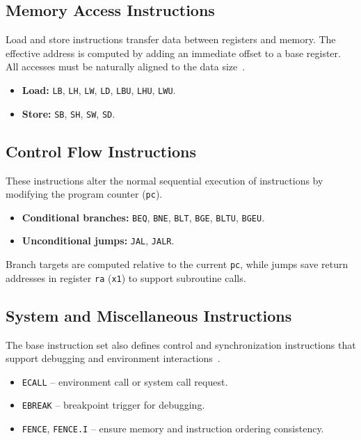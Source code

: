 \subsection{Memory Access Instructions}
Load and store instructions transfer data between registers and memory.  
The effective address is computed by adding an immediate offset to a base register.  
All accesses must be naturally aligned to the data size~\cite{riscv-spec}.
\begin{itemize}
  \item \textbf{Load:} \texttt{LB}, \texttt{LH}, \texttt{LW}, \texttt{LD}, \texttt{LBU}, \texttt{LHU}, \texttt{LWU}.
  \item \textbf{Store:} \texttt{SB}, \texttt{SH}, \texttt{SW}, \texttt{SD}.
\end{itemize}

\subsection{Control Flow Instructions}
These instructions alter the normal sequential execution of instructions by modifying the program counter (\texttt{pc}).
\begin{itemize}
  \item \textbf{Conditional branches:} \texttt{BEQ}, \texttt{BNE}, \texttt{BLT}, \texttt{BGE}, \texttt{BLTU}, \texttt{BGEU}.
  \item \textbf{Unconditional jumps:} \texttt{JAL}, \texttt{JALR}.
\end{itemize}
Branch targets are computed relative to the current \texttt{pc}, while jumps save return addresses in register \texttt{ra} (\texttt{x1}) to support subroutine calls.

\subsection{System and Miscellaneous Instructions}
The base instruction set also defines control and synchronization instructions that support debugging and environment interactions~\cite{riscv-spec}.
\begin{itemize}
  \item \texttt{ECALL} – environment call or system call request.
  \item \texttt{EBREAK} – breakpoint trigger for debugging.
  \item \texttt{FENCE}, \texttt{FENCE.I} – ensure memory and instruction ordering consistency.
\end{itemize}

